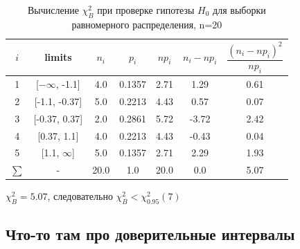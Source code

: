 \begin{table}[H]
	\begin{center}
		\begin{tabular}{|c|c|c|c|c|c|c|}
			\hline
			$i$ & limits & $n_i$ & $p_i$ & $np_i$ & $n_i - np_i$ & $\dfrac{(n_i-np_i)^2}{np_i}$ \\
			\hline
			1 & [$-\infty$, -1.1] & 4.0 & 0.1357 & 2.71 & 1.29 & 0.61 \\
			2 & [-1.1, -0.37] & 5.0 & 0.2213 & 4.43 & 0.57 & 0.07 \\
			3 & [-0.37, 0.37] & 2.0 & 0.2861 & 5.72 & -3.72 & 2.42 \\
			4 & [0.37, 1.1] & 4.0 & 0.2213 & 4.43 & -0.43 & 0.04 \\
			5 & [1.1, $\infty$] & 5.0 & 0.1357 & 2.71 & 2.29 & 1.93 \\
			\hline
			$\sum$ & - & 20.0 & 1.0 & 20.0 & 0.0 & 5.07\\
			\hline
		\end{tabular}
	\end{center}
	\caption{Вычисление $\chi_{B}^2$ при проверке гипотезы $H_0$ для выборки равномерного распределения, n=20}
\end{table} 

$\chi_{B}^2 = 5.07$, следовательно  $\chi_{B}^2 <\chi^{2}_{0.95}(7)$ \\

\subsection{Что-то там про доверительные интервалы}
